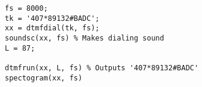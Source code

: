 \begin{lstlisting}[Language=Matlab]
fs = 8000;
tk = '407*89132#BADC';
xx = dtmfdial(tk, fs);
soundsc(xx, fs) % Makes dialing sound
L = 87;

dtmfrun(xx, L, fs) % Outputs '407*89132#BADC'
spectogram(xx, fs)
\end{lstlisting}